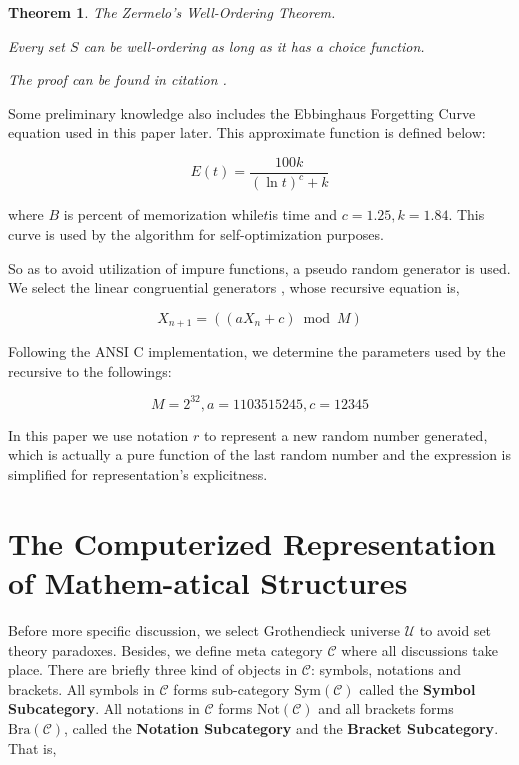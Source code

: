 \documentclass{aims}
\newtheorem{theorem}{Theorem}	%
\numberwithin{theorem}{section}	%
\numberwithin{axiom}{section}	%
\numberwithin{definition}{section}	%
\begin{document}
\begin{theorem}
	The Zermelo{'}s Well-Ordering Theorem.\cite{Li2019}
	
	Every set \(S\) can be well-ordering as long as it has a choice function.
	
	The proof can be found in citation \cite{Li2019}.
\end{theorem}

Some preliminary knowledge also includes the Ebbinghaus Forgetting Curve equation \cite{Ebbinghaus1913} used in this paper later. This approximate function is defined below:

\begin{equation*}
	E(\mathit{t})=\frac{100 k}{(\ln  t)^c+k}
\end{equation*}

\noindent where \(B\) is percent of memorization while\(t\)is time and \(c=1.25,k=1.84\). This curve is used by the algorithm for self-optimization purposes.

So as to avoid utilization of impure functions, a pseudo random generator is used. We select the linear congruential generators \cite{Entacher1997}, whose recursive equation is,

\begin{equation*}
	X_{n+1}=(\left(a X_n+c\right) \bmod M)
\end{equation*}

Following the ANSI C implementation, we determine the parameters used by the recursive to the followings:

\begin{equation*}
	M=2^{32},a=1103515245, c=12345
\end{equation*}

In this paper we use notation \(\mathit{r}\) to represent a new random number generated, which is actually a pure function of the last random number and the expression is simplified for representation{'}s explicitness.

\section{The Computerized Representation of Mathem-atical Structures}

Before more specific discussion, we select Grothendieck universe \(\mathcal{U}\) \cite{Li2019} to avoid set theory paradoxes. Besides, we define meta category \(\mathcal{C}\) where all discussions take place. There are briefly three kind of objects in \(\mathcal{C}\): symbols, notations and brackets. All symbols in \(\mathcal{C}\) forms sub-category \(\text{Sym}(\mathcal{C})\) called the \textbf{ Symbol Subcategory}. All notations in \(\mathcal{C}\) forms \(\text{Not}(\mathcal{C})\) and all brackets forms \(\text{Bra}(\mathcal{C})\), called the \textbf{ Notation Subcategory} and the \textbf{ Bracket Subcategory}. That is,
\end{document}
